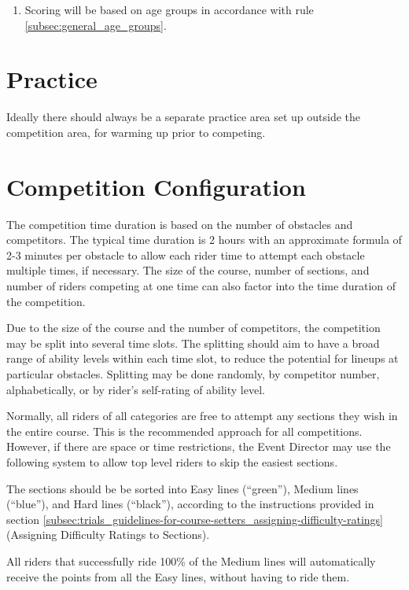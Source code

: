 \begin{enumerate}[leftmargin=1.5em,labelsep=*]
	\item Scoring will be based on age groups in accordance with rule \ref{subsec:general_age_groups}.
\end{enumerate}

\section{Practice}

Ideally there should always be a separate practice area set up outside the competition area, for warming up prior to competing.

\section{Competition Configuration}

The competition time duration is based on the number of obstacles and competitors.
The typical time duration is 2 hours with an approximate formula of 2-3 minutes per obstacle to allow each rider time to attempt each obstacle multiple times, if necessary.
The size of the course, number of sections, and number of riders competing at one time can also factor into the time duration of the competition.

Due to the size of the course and the number of competitors, the competition may be split into several time slots.
The splitting should aim to have a broad range of ability levels within each time slot, to reduce the potential for lineups at particular obstacles.
Splitting may be done randomly, by competitor number, alphabetically, or by rider's self-rating of ability level.

\label{sec:trials_section-restrictions-for-competition-categories}
Normally, all riders of all categories are free to attempt any sections they wish in the entire course.
This is the recommended approach for all competitions.
However, if there are space or time restrictions, the Event Director may use the following system to allow top level riders to skip the easiest sections.

The sections should be be sorted into Easy lines (``green''), Medium lines (``blue''), and Hard lines (``black''), according to the instructions provided in section \ref{subsec:trials_guidelines-for-course-setters_assigning-difficulty-ratings} (Assigning Difficulty Ratings to Sections).

All riders that successfully ride 100\% of the Medium lines will automatically receive the points from all the Easy lines, without having to ride them.

